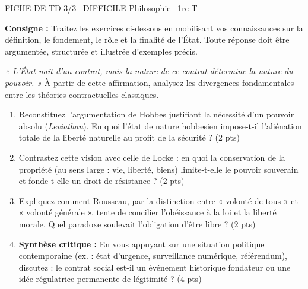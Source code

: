 \documentclass[11pt]{article}
\begin{document}
\begin{tcolorbox}[enhanced,colback=popink,colframe=popink,arc=10pt,boxrule=0pt,left=12pt,right=12pt,top=9pt,bottom=9pt]
{\color{white}\popxbold\small FICHE DE TD 3/3 \textbullet\ DIFFICILE \hfill Philosophie \textbullet\ 1re T\par}
\end{tcolorbox}
\vspace{4pt}
\noindent\textbf{Consigne :} Traitez les exercices ci-dessous en mobilisant vos connaissances sur la définition, le fondement, le rôle et la finalité de l'État. Toute réponse doit être argumentée, structurée et illustrée d'exemples précis.

\begin{exercice}
\emph{« L'État naît d'un contrat, mais la nature de ce contrat détermine la nature du pouvoir. »} À partir de cette affirmation, analysez les divergences fondamentales entre les théories contractuelles classiques.

\begin{enumerate}
    \item Reconstituez l'argumentation de Hobbes justifiant la nécessité d'un pouvoir absolu (\emph{Leviathan}). En quoi l'état de nature hobbesien impose-t-il l'aliénation totale de la liberté naturelle au profit de la sécurité ? (2 pts)
    \item Contrastez cette vision avec celle de Locke : en quoi la conservation de la propriété (au sens large : vie, liberté, biens) limite-t-elle le pouvoir souverain et fonde-t-elle un droit de résistance ? (2 pts)
    \item Expliquez comment Rousseau, par la distinction entre « volonté de tous » et « volonté générale », tente de concilier l'obéissance à la loi et la liberté morale. Quel paradoxe soulevait l'obligation d'être libre ? (2 pts)
    \item \textbf{Synthèse critique :} En vous appuyant sur une situation politique contemporaine (ex. : état d'urgence, surveillance numérique, référendum), discutez : le contrat social est-il un événement historique fondateur ou une idée régulatrice permanente de légitimité ? (4 pts)
\end{enumerate}
\end{exercice}
\end{document}
